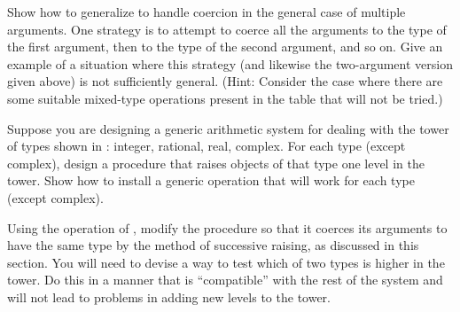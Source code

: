 \begin{exercise}
	\label{Exercise 2.82}
	Show how to generalize  to handle coercion in the general case of multiple arguments.
	One strategy is to attempt to coerce all the arguments to the type of the first argument, then to the type of the second argument, and so on.
	Give an example of a situation where this strategy (and likewise the two-argument version given above) is not sufficiently general.
	(Hint:
	Consider the case where there are some suitable mixed-type operations present in the table that will not be tried.)
\end{exercise}



\begin{exercise}
	\label{Exercise 2.83}
	Suppose you are designing a generic arithmetic system for dealing with the tower of types shown in :
	integer, rational, real, complex.
	For each type (except complex), design a procedure that raises objects of that type one level in the tower.
	Show how to install a generic  operation that will work for each type (except complex).
\end{exercise}



\begin{exercise}
	\label{Exercise 2.84}
	Using the  operation of , modify the  procedure so that it coerces its arguments to have the same type by the method of successive raising, as discussed in this section.
	You will need to devise a way to test which of two types is higher in the tower.
	Do this in a manner that is “compatible” with the rest of the system and will not lead to problems in adding new levels to the tower.
\end{exercise}



